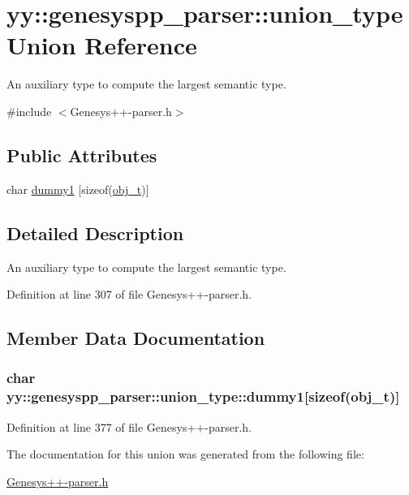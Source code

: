 \hypertarget{unionyy_1_1genesyspp__parser_1_1union__type}{\section{yy\-:\-:genesyspp\-\_\-parser\-:\-:union\-\_\-type Union Reference}
\label{unionyy_1_1genesyspp__parser_1_1union__type}
}


An auxiliary type to compute the largest semantic type.  




{\ttfamily \#include $<$Genesys++-\/parser.\-h$>$}

\subsection*{Public Attributes}
\begin{DoxyCompactItemize}
\item 
char \hyperlink{unionyy_1_1genesyspp__parser_1_1union__type_a431bf7ff5c124f551121f0ac3483616b}{dummy1} \mbox{[}sizeof(\hyperlink{classobj__t}{obj\-\_\-t})\mbox{]}
\end{DoxyCompactItemize}


\subsection{Detailed Description}
An auxiliary type to compute the largest semantic type. 

Definition at line 307 of file Genesys++-\/parser.\-h.



\subsection{Member Data Documentation}
\hypertarget{unionyy_1_1genesyspp__parser_1_1union__type_a431bf7ff5c124f551121f0ac3483616b}{
\subsubsection[{dummy1}]{\setlength{\rightskip}{0pt plus 5cm}char yy\-::genesyspp\-\_\-parser\-::union\-\_\-type\-::dummy1\mbox{[}sizeof({\bf obj\-\_\-t})\mbox{]}}}\label{unionyy_1_1genesyspp__parser_1_1union__type_a431bf7ff5c124f551121f0ac3483616b}


Definition at line 377 of file Genesys++-\/parser.\-h.



The documentation for this union was generated from the following file\-:\begin{DoxyCompactItemize}
\item 
\hyperlink{_genesys_09_09-parser_8h}{Genesys++-\/parser.\-h}\end{DoxyCompactItemize}
